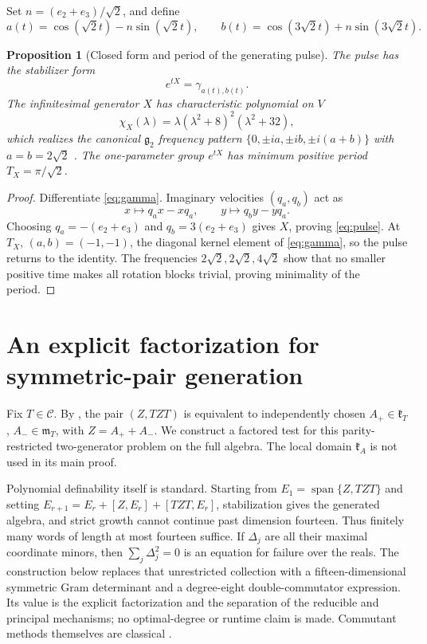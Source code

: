 \documentclass[11pt,a4paper]{article}
\newtheorem{proposition}[proposition]{Proposition}
\newcommand{\Span}{\operatorname{span}}
\begin{document}
Set $n=(e_2+e_3)/\sqrt2$, and define
\[
a(t)=\cos(\sqrt2t)-n\sin(\sqrt2t),\qquad
b(t)=\cos(3\sqrt2t)+n\sin(3\sqrt2t).
\]

\begin{proposition}[Closed form and period of the generating pulse]
\label{prop:pulse}
The pulse has the stabilizer form
\begin{equation}
e^{tX}=\gamma_{a(t),b(t)}.
\label{eq:pulse}
\end{equation}
The infinitesimal generator $X$ has characteristic polynomial on $V$
\[
\chi_X(\lambda)=\lambda(\lambda^2+8)^2(\lambda^2+32),
\]
which realizes the canonical $\mathfrak g_2$ frequency pattern $\{0,\pm ia,\pm ib,\pm i(a+b)\}$ with $a=b=2\sqrt2$ \cite{ChemtovKarigiannis2022}.  The one-parameter group $e^{tX}$ has minimum positive period $T_X=\pi/\sqrt2$.
\end{proposition}

\begin{proof}
Differentiate \eqref{eq:gamma}.  Imaginary velocities $(q_a,q_b)$ act as
\[
x\mapsto q_ax-xq_a,
\qquad
y\mapsto q_by-yq_a.
\]
Choosing $q_a=-(e_2+e_3)$ and $q_b=3(e_2+e_3)$ gives $X$, proving \eqref{eq:pulse}.  At $T_X$, $(a,b)=(-1,-1)$, the diagonal kernel element of \eqref{eq:gamma}, so the pulse returns to the identity.  The frequencies $2\sqrt2,2\sqrt2,4\sqrt2$ show that no smaller positive time makes all rotation blocks trivial, proving minimality of the period.
\end{proof}

\section{An explicit factorization for symmetric-pair generation}\label{sec:universal-locus}
Fix $T\in\mathscr C$.  By , the pair $(Z,TZT)$ is equivalent to independently chosen $A_+\in\mathfrak k_T$, $A_-\in\mathfrak m_T$, with $Z=A_++A_-$.
We construct a factored test for this parity-restricted two-generator problem on the full algebra.  The local domain $\mathfrak k_A$ is not used in its main proof.

Polynomial definability itself is standard.  Starting from $E_1=\Span\{Z,TZT\}$ and setting
$E_{r+1}=E_r+[Z,E_r]+[TZT,E_r]$, stabilization gives the generated algebra, and strict growth cannot continue past dimension fourteen.
Thus finitely many words of length at most fourteen suffice.  If $\Delta_j$ are all their maximal coordinate minors, then $\sum_j\Delta_j^2=0$ is an equation for failure over the reals.
The construction below replaces that unrestricted collection with a fifteen-dimensional symmetric Gram determinant and a degree-eight double-commutator expression.
Its value is the explicit factorization and the separation of the reducible and principal mechanisms; no optimal-degree or runtime claim is made.
Commutant methods themselves are classical \cite{ZeierSchulteHerbrueggen2011}.
\end{document}

